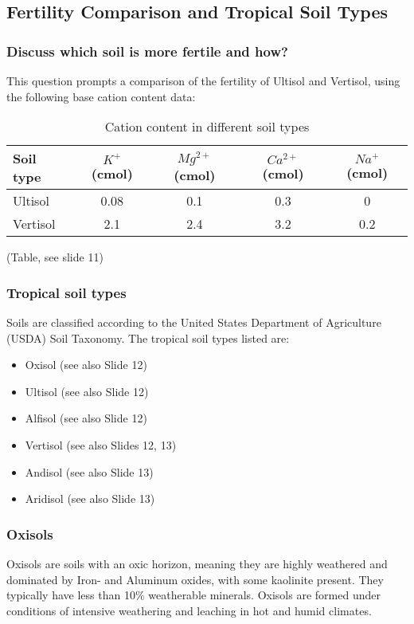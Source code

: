 \subsection{Fertility Comparison and Tropical Soil Types} \subsubsection*{Discuss which soil is more fertile and how?} This question prompts a comparison of the fertility of Ultisol and Vertisol, using the following base cation content data:
\begin{table}[h]
    \centering
    \caption{Cation content in different soil types}
    \label{tab:soil_cations}
    \begin{tabular}{ l | c | c | c | c }
        \textbf{Soil type} & \textbf{$K^+$} (cmol) & \textbf{$Mg^{2+}$} (cmol) & \textbf{$Ca^{2+}$} (cmol) & \textbf{$Na^+$} (cmol) \\ 
        \hline
        Ultisol  & 0.08 & 0.1 & 0.3 & 0   \\
        Vertisol & 2.1  & 2.4 & 3.2 & 0.2 \\
    \end{tabular}
\end{table}

(Table, see slide 11) 

\subsubsection*{Tropical soil types} Soils are classified according to the United States Department of Agriculture (USDA) Soil Taxonomy. The tropical soil types listed are: 

\begin{itemize} 
    \item Oxisol (see also Slide 12) 
    \item Ultisol (see also Slide 12) 
    \item Alfisol (see also Slide 12) 
    \item Vertisol (see also Slides 12, 13) 
    \item Andisol (see also Slide 13) 
    \item Aridisol (see also Slide 13) 
\end{itemize}

\subsubsection*{Oxisols} Oxisols are soils with an oxic horizon, meaning they are highly weathered and dominated by Iron- and Aluminum oxides, with some kaolinite present. They typically have less than 10\% weatherable minerals. Oxisols are formed under conditions of intensive weathering and leaching in hot and humid climates.

